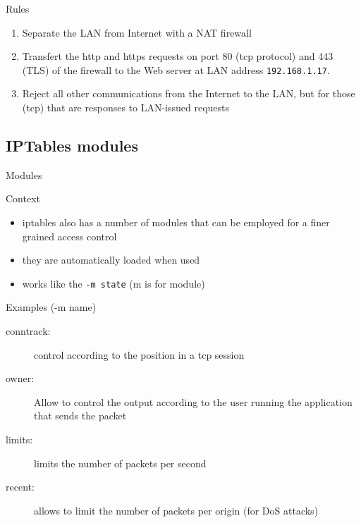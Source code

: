 \begin{reveals}
\begin{frame}[c,fragile]{Rules}
  \begin{enumerate}
  \item Separate the LAN from Internet with a NAT firewall
  \item Transfert the http and https requests on port 80 (tcp
    protocol) and 443 (TLS) of the firewall to the Web server at LAN
    address \verb+192.168.1.17+.
  \item Reject all other communications from the Internet to the LAN,
    but for those (tcp) that are responses to LAN-issued requests
  \end{enumerate}

\end{frame}



\subsection{IPTables modules}

\begin{frame}[c]{Modules}
  
  \begin{block}{Context}
    \begin{itemize}
    \item iptables also has a number of modules that can be employed
      for a finer grained access control
    \item they are automatically loaded when used
    \item works like the \texttt{-m state} (m is for module)
    \end{itemize}
  \end{block}

  \vfill

  \begin{block}{Examples (-m name)}
    \begin{description}
    \item[conntrack:] control according to the position in a tcp session
    \item[owner:] Allow to control the output according to the user
      running the application that sends the packet
    \item[limits:] limits the number of packets per second
    \item[recent:] allows to limit the number of packets per origin
      (for DoS attacks)
    \end{description}
  \end{block}


\end{frame}
\end{reveals}

